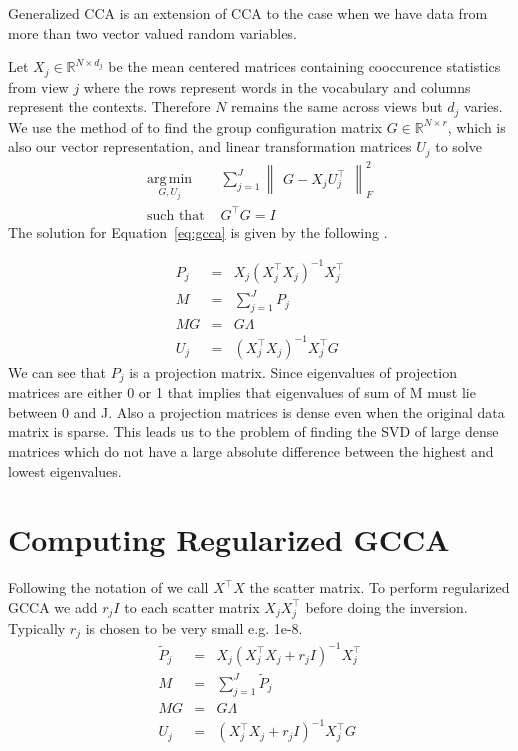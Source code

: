 \documentclass[11pt]{article}
\begin{document}
Generalized CCA
\cite{kettenring1971canonical,carroll1968generalization} is an
extension of CCA to the case when we have data from more than two
vector valued random variables. 

Let $X_j \in \mathbb{R}^{N\times d_j}$ be the mean centered matrices containing cooccurence statistics from view
$j$ where the rows represent words in the vocabulary and columns
represent the contexts. Therefore $N$ remains the
same across views but  $d_j$ varies.
We use the method of \cite{carroll1968generalization} to find the
 group configuration matrix $G \in \mathbb{R}^{N\times r}$, which is
 also our vector representation, and linear transformation matrices
 $U_j$ to solve 
\begin{equation}
  \label{eq:gcca}
\begin{split}
  \operatorname*{arg\,min}_{G,U_j} & \sum_{j=1}^J \begin{Vmatrix} G - X_jU_j^\top \end{Vmatrix}^2_F \\
  \text{such that } & G^\top G = I
\end{split}
\end{equation}
The solution for Equation~\ref{eq:gcca} is given by the following \cite{carroll1968generalization}.

\begin{eqnarray}
P_j &=& X_j(X_j^\top X_j)^{-1}X_j^\top \\
M &=& \sum_{j=1}^J P_j\\
M G &=& G \Lambda\\
U_j &=& \left(X_j^\top X_j\right)^{-1} X_j^\top G
\end{eqnarray}
We can see that $P_j$ is a projection matrix. Since eigenvalues of
projection matrices are either 0 or 1 that implies 
that eigenvalues of sum of M must lie between 0 and J.
Also a projection matrices is dense even when the original data matrix
is sparse. This leads us to the problem of finding the SVD of large
dense matrices which do not have a large absolute difference between
the highest and lowest eigenvalues.

\section{Computing Regularized GCCA}
\label{sec:rgcca}
Following the notation of \cite{hastie2009elements} we call $X^\top X$
the scatter matrix. To perform regularized GCCA we add $r_jI$ to each
scatter matrix $X_j X_j^\top$ before doing the inversion. Typically
$r_j$ is chosen to be very small e.g. 1e-8.
\begin{eqnarray}
  \widetilde{P}_{j} &=& X_j(X_j^\top X_j+r_jI)^{-1}X_j^\top\\
  M &=& \sum_{j=1}^J \widetilde{P}_{j} \\
  MG &=& G\Lambda \\
  U_j &=& (X_j^\top X_j+r_jI)^{-1} X_j^\top G
\end{eqnarray}
\end{document}
